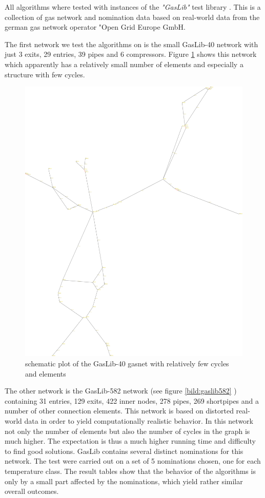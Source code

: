 All algorithms where tested with instances of the \textit{"GasLib"} test library \cite{gaslib}. This is a 
collection of gas network and nomination data based on real-world data from the german gas network operator "Open Grid 
Europe GmbH. 

The first network we test the algorithms on is the small GasLib-40 network with just 3 exits, 29 entries, 39 
pipes and 6 compressors. Figure \ref{bild:gaslib40} shows this network which apparently has a relatively small number 
of elements and especially a structure with few cycles.

\begin{figure}[h!, scale = 0.6]
  \centering
  \includegraphics[width=.6\textwidth]{gaslib-40_bild.pdf}
  \caption{schematic plot of the GasLib-40 gasnet with relatively few cycles and elements}
  \label{bild:gaslib40}
\end{figure}


The other network is the GasLib-582 network (see figure \ref{bild:gaslib582} ) containing 31 entries, 129 exits, 422 
inner nodes, 278 pipes, 269 shortpipes and a number of other connection elements. This network is based on distorted 
real-world data in order to yield computationally realistic behavior. In this network not only the number of elements 
but also the number of cycles in the graph is much higher. The expectation is thus a much higher running time and 
difficulty to find good solutions. GasLib contains several distinct nominations for this network. The test were 
carried out on a set of 5 nominations chosen, one for each temperature class. The result tables show that the behavior
of the algorithms is only by a small part affected by the nominations, which yield rather similar overall outcomes.\\

